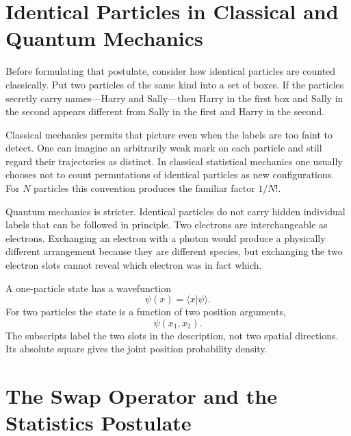 \begin{classroomqa}
\end{classroomqa}

\section{Identical Particles in Classical and Quantum Mechanics}

Before formulating that postulate, consider how identical particles are counted classically. Put two particles of the same kind into a set of boxes. If the particles secretly carry names---Harry and Sally---then Harry in the first box and Sally in the second appears different from Sally in the first and Harry in the second.

Classical mechanics permits that picture even when the labels are too faint to detect. One can imagine an arbitrarily weak mark on each particle and still regard their trajectories as distinct. In classical statistical mechanics one usually chooses not to count permutations of identical particles as new configurations. For \(N\) particles this convention produces the familiar factor \(1/N!\).

Quantum mechanics is stricter. Identical particles do not carry hidden individual labels that can be followed in principle. Two electrons are interchangeable as electrons. Exchanging an electron with a photon would produce a physically different arrangement because they are different species, but exchanging the two electron slots cannot reveal which electron was in fact which.

A one-particle state has a wavefunction
\[
\psi(x)=\langle x\vert\psi\rangle.
\]
For two particles the state is a function of two position arguments,
\begin{equation}
\psi(x_{1},x_{2}).
\end{equation}
The subscripts label the two slots in the description, not two spatial directions. Its absolute square gives the joint position probability density.

\section{The Swap Operator and the Statistics Postulate}

